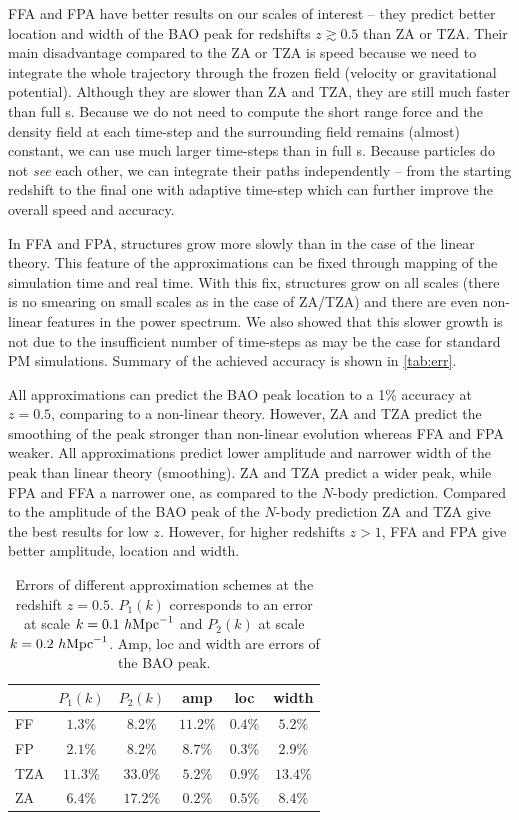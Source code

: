 FFA and FPA have better results on our scales of interest -- they predict better location and width of the BAO peak for redshifts $z\gtrsim0.5$ than ZA or TZA. Their main disadvantage compared to the ZA or TZA is speed because we need to integrate the whole trajectory through the frozen field (velocity or gravitational potential). Although they are slower than ZA and TZA, they are still much faster than full \nbodysim s. Because we do not need to compute the short range force and the density field at each time-step and the surrounding field remains (almost) constant, we can use much larger time-steps than in full \nbodysim s. Because particles do not \textit{see} each other, we can integrate their paths independently -- from the starting redshift to the final one with adaptive time-step which can further improve the overall speed and accuracy.

In FFA and FPA, structures grow more slowly than in the case of the linear theory. This feature of the approximations can be fixed through mapping of the simulation time and real time. With this fix, structures grow on all scales (there is no smearing on small scales as in the case of ZA/TZA) and there are even non-linear features in the power spectrum. We also showed that this slower growth is not due to the insufficient number of time-steps as may be the case for standard PM simulations. Summary of the achieved accuracy is shown in \autoref{tab:err}.

All approximations can predict the BAO peak location to a 1\% accuracy at $z=0.5$, comparing to a non-linear theory. However, ZA and TZA predict the smoothing of the peak stronger than non-linear evolution \parencite[see, e.g.,][]{2007ApJ...664..660E, 2014JCAP...02..042S} whereas FFA and FPA weaker. All approximations predict lower amplitude and narrower width of the peak than linear theory (smoothing). ZA and TZA predict a wider peak, while FPA and FFA a narrower one, as compared to the $N$-body prediction. Compared to the amplitude of the BAO peak of the $N$-body prediction ZA and TZA give the best results for low $z$. However, for higher redshifts $z>1$, FFA and FPA give better amplitude, location and width.
\begin{table}
\centering
\begin{tabular}{lccccc}
	\hline \hline
	 & $P_1(k)$ & $P_2(k)$ & amp & loc & width \\ 
	\hline
	FF & $1.3\%$ & $8.2\%$ & $11.2\%$ & $0.4\%$ & $5.2\%$ \\
	FP & $2.1\%$ & $8.2\%$ & $8.7\%$ & $0.3\%$ & $2.9\%$ \\
	TZA & $11.3\%$ & $33.0\%$ & $5.2\%$ & $0.9\%$ & $13.4\%$ \\
	ZA & $6.4\%$ & $17.2\%$ & $0.2\%$ & $0.5\%$ & $8.4\%$ \\
	\hline \hline
\end{tabular}
 \caption
{Errors of different approximation schemes at the redshift $z=0.5$. $P_1(k)$ corresponds to an error at scale $k = 0.1~h\text{Mpc}^{-1}$ and $P_2(k)$ at scale $k = 0.2~h\text{Mpc}^{-1}$. Amp, loc and width are errors of the BAO peak.}
\label{tab:err}
\end{table}

